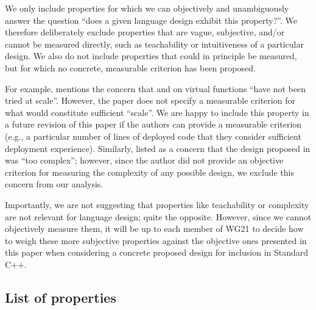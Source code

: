 We only include properties for which we can objectively and unambiguously answer the question ``does a given language design exhibit this property?''. We therefore deliberately exclude properties that are vague, subjective, and/or cannot be measured directly, such as teachability or intuitiveness of a particular design. We also do not include properties that could in principle be measured, but for which no concrete, measurable criterion has been proposed.

For example, \cite{P3573R0} mentions the concern that  and  on virtual functions ``have not been tried at scale''. However, the paper does not specify a measurable criterion for what would constitute sufficient ``scale''. We are happy to include this property in a future revision of this paper if the authors can provide a measurable criterion (e.g., a particular number of lines of deployed code that they consider sufficient deployment experience). Similarly, \cite{P3506R0} listed as a concern that the design proposed in \cite{P3097R0} was ``too complex''; however, since the author did not provide an objective criterion for measuring the complexity of any possible design, we exclude this concern from our analysis.

Importantly, we are not suggesting that properties like teachability or complexity are not relevant for language design; quite the opposite. However, since we cannot objectively measure them, it will be up to each member of WG21 to decide how to weigh these more subjective properties against the objective ones presented in this paper when considering a concrete proposed design for inclusion in Standard C++.

\subsection{List of properties}


\newcommand{\prop}[2]{
  \paragraph*{\tcode{#1}: #2}
  \refstepcounter{paragraph}
  \label{#1}
  \addcontentsline{toc}{paragraph}{\tcode{#1}: #2}
  \mbox{}\vspace{0.5em} %
  \nopagebreak[4]
}


